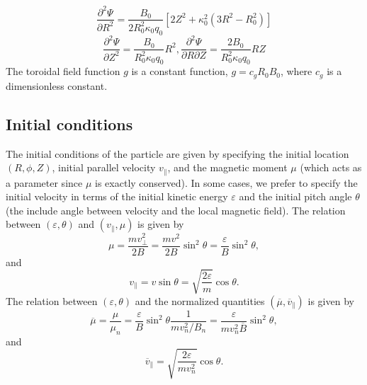 \documentclass{article}
\begin{document}
\begin{equation}
  \frac{\partial^2 \Psi}{\partial R^2} = \frac{B_0}{2 R_0^2 \kappa_0 q_0} [2
  Z^2 + \kappa_0^2 (3 R^2 - R_0^2)]
\end{equation}
\begin{equation}
  \frac{\partial^2 \Psi}{\partial Z^2} = \frac{B_0}{R_0^2 \kappa_0 q_0} R^2,
  \frac{\partial^2 \Psi}{\partial R \partial Z} = \frac{2 B_0}{R_0^2 \kappa_0
  q_0} R Z
\end{equation}
\begin{equation}
  \ 
\end{equation}
The toroidal field function $g$ is a constant function, $g = c_g R_0 B_0$,
where $c_g$ is a dimensionless constant.

\subsection{Initial conditions}

The initial conditions of the particle are given by specifying the initial
location $(R, \phi, Z)$, initial parallel velocity $v_{\parallel}$, and the
magnetic moment $\mu$ (which acts as a parameter since $\mu$ is exactly
conserved). In some cases, we prefer to specify the initial velocity in terms
of the initial kinetic energy $\varepsilon$ and the initial pitch angle
$\theta$ (the include angle between velocity and the local magnetic field).
The relation between $(\varepsilon, \theta)$ and $(v_{\parallel}, \mu)$ is
given by
\begin{equation}
  \mu = \frac{m v_{\perp}^2}{2 B} = \frac{m v^2}{2 B} \sin^2 \theta =
  \frac{\varepsilon}{B} \sin^2 \theta,
\end{equation}
and
\begin{equation}
  v_{\parallel} = v \sin \theta = \sqrt{\frac{2 \varepsilon}{m}} \cos \theta .
\end{equation}
The relation between $(\varepsilon, \theta)$ and the normalized quantities
$(\overline{\mu}, \overline{v}_{\parallel})$ is given by
\begin{equation}
  \overline{\mu} = \frac{\mu}{\mu_n} = \frac{\varepsilon}{B} \sin^2 \theta
  \frac{1}{m v_n^2 / B_n} = \frac{\varepsilon}{m v_n^2 \overline{B}} \sin^2
  \theta,
\end{equation}
and
\begin{equation}
  \overline{v}_{\parallel} = \sqrt{\frac{2 \varepsilon}{m v_n^2}} \cos \theta
  .
\end{equation}
\end{document}
